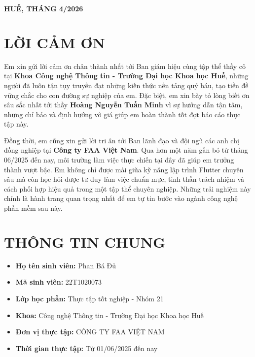 \documentclass[12pt, a4paper]{article}
\begin{document}
\begin{titlepage}
    \vfill
    \begin{center}
        \textbf{HUẾ, THÁNG 4/2026}
    \end{center}
    \restoregeometry
\end{titlepage}

\newpage

\section*{LỜI CẢM ƠN}
Em xin gửi lời cảm ơn chân thành nhất tới Ban giám hiệu cùng tập thể thầy cô tại \textbf{Khoa Công nghệ Thông tin - Trường Đại học Khoa học Huế}, những người đã luôn tận tụy truyền đạt những kiến thức nền tảng quý báu, tạo tiền đề vững chắc cho con đường sự nghiệp của em. Đặc biệt, em xin bày tỏ lòng biết ơn sâu sắc nhất tới thầy \textbf{Hoàng Nguyễn Tuấn Minh} vì sự hướng dẫn tận tâm, những chỉ bảo và định hướng vô giá giúp em hoàn thành tốt đợt báo cáo thực tập này.

Đồng thời, em cũng xin gửi lời tri ân tới Ban lãnh đạo và đội ngũ các anh chị đồng nghiệp tại \textbf{Công ty FAA Việt Nam}. Qua hơn một năm gắn bó từ tháng 06/2025 đến nay, môi trường làm việc thực chiến tại đây đã giúp em trưởng thành vượt bậc. Em không chỉ được mài giũa kỹ năng lập trình Flutter chuyên sâu mà còn học hỏi được tư duy làm việc chuẩn mực, tinh thần trách nhiệm và cách phối hợp hiệu quả trong một tập thể chuyên nghiệp. Những trải nghiệm này chính là hành trang quan trọng nhất để em tự tin bước vào ngành công nghệ phần mềm sau này.

\newpage
\renewcommand{\contentsname}{MỤC LỤC}
\tableofcontents
\newpage


\section{THÔNG TIN CHUNG}
\begin{itemize}
    \item \textbf{Họ tên sinh viên:} Phan Bá Đủ
    \item \textbf{Mã sinh viên:} 22T1020073
    \item \textbf{Lớp học phần:} Thực tập tốt nghiệp - Nhóm 21
    \item \textbf{Khoa:} Công nghệ Thông tin - Trường Đại học Khoa học Huế
    \item \textbf{Đơn vị thực tập:} CÔNG TY FAA VIỆT NAM
    \item \textbf{Thời gian thực tập:} Từ 01/06/2025 đến nay
\end{itemize}
\end{document}
